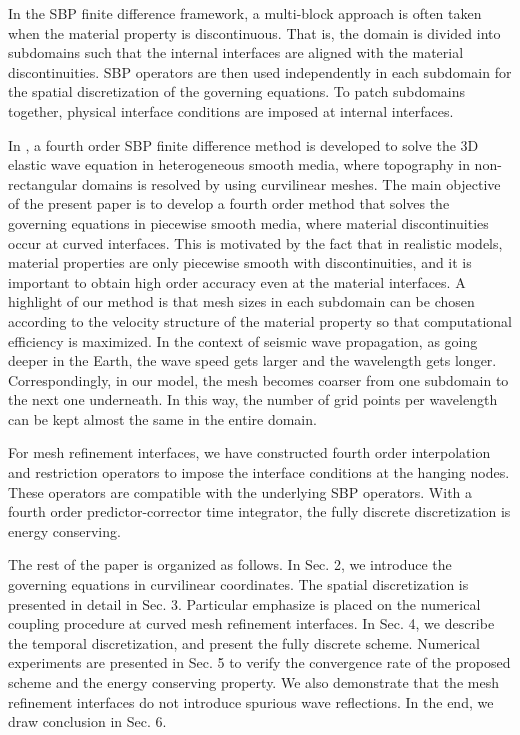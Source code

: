 In the SBP finite difference framework, a multi-block approach is often taken when the material property is discontinuous. That is, the domain is divided into subdomains such that the internal interfaces are aligned with the material discontinuities. SBP operators are then used independently in each subdomain for the spatial discretization of the governing equations. To patch subdomains together, physical interface conditions are imposed at internal interfaces. 



In \cite{petersson2015wave}, a fourth order SBP finite difference method is developed to solve the 3D elastic wave equation in heterogeneous smooth media, where topography in non-rectangular domains is resolved by using curvilinear meshes. The main objective of the present paper is to develop a fourth order method that solves the governing equations in piecewise smooth media, where material discontinuities occur at curved interfaces. This is motivated by the fact that in realistic models, material properties are only piecewise smooth with discontinuities, and it is important to obtain high order accuracy even at the material interfaces. A highlight of our method is that  mesh sizes in each subdomain can be chosen according to the velocity structure of the material property so that computational efficiency is maximized. In the context of seismic wave propagation, as going deeper in the Earth, the wave speed gets larger and the wavelength gets longer. Correspondingly, in our model, the mesh becomes coarser from one subdomain to the next one underneath. In this way, the number of grid points per wavelength can be kept almost the same in the entire domain. 

For mesh refinement interfaces, we have constructed fourth order interpolation and restriction operators to impose the interface conditions at the hanging nodes. These operators are compatible with the underlying SBP operators. With a fourth order predictor-corrector time integrator, the fully discrete discretization is energy conserving. 

The rest of the paper is organized as follows. In Sec. 2, we introduce the governing equations in curvilinear coordinates. The spatial discretization is presented in detail in Sec. 3. Particular emphasize is placed on the numerical coupling procedure at curved mesh refinement interfaces. In Sec. 4, we describe the temporal discretization, and present the fully discrete scheme. Numerical experiments are presented in Sec. 5 to verify the convergence rate of the proposed scheme and the energy conserving property. We also demonstrate that the mesh refinement interfaces do not introduce spurious wave reflections. In the end, we draw conclusion in Sec. 6. 
